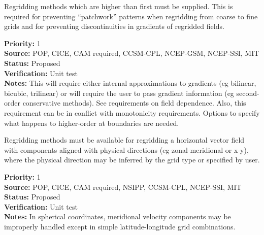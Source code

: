 
Regridding methods which are higher than first 
must be supplied.  This is required for preventing
``patchwork'' patterns when regridding from coarse to fine
grids and for preventing discontinuities in gradients of
regridded fields.

\begin{reqlist}
{\bf Priority:} 1 \\
{\bf Source:}  POP, CICE, CAM required, CCSM-CPL, NCEP-GSM, NCEP-SSI, MIT \\
{\bf Status:} Proposed \\
{\bf Verification:} Unit test \\
{\bf Notes:} This will require either internal approximations to
             gradients (eg bilinear, bicubic, trilinear) or will require the
             user to pass gradient information (eg second-order conservative
             methods).  See requirements on field dependence.  Also, this
             requirement can be in conflict with monotonicity requirements.
             Options to specify what happens to higher-order at
             boundaries are needed.
\end{reqlist}


Regridding methods must be available for regridding a horizontal
vector field with components aligned with physical directions
(eg zonal-meridional or x-y), where the physical direction may be
inferred by the grid type or specified by user.

\begin{reqlist}
{\bf Priority:} 1 \\
{\bf Source:}  POP, CICE, CAM required, NSIPP, CCSM-CPL, NCEP-SSI, MIT \\
{\bf Status:} Proposed \\
{\bf Verification:} Unit test \\
{\bf Notes:} In spherical coordinates, meridional velocity components
             may be improperly handled except in simple latitude-longitude
             grid combinations.
\end{reqlist}


